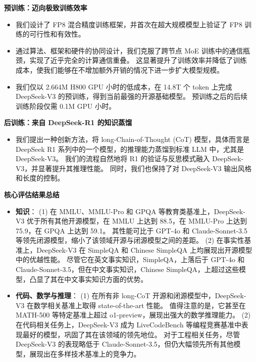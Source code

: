 \documentclass[11pt, a4paper, logo, copyright, nonumbering]{deepseek}
\newcommand{\dsviii}{DeepSeek-V3}
\begin{document}
\noindent
\textbf{预训练：迈向极致训练效率}
\begin{itemize}[topsep=0pt]
    \item
    我们设计了 FP8 混合精度训练框架，并首次在超大规模模型上验证了 FP8 训练的可行性和有效性。
    \item 
    通过算法、框架和硬件的协同设计，我们克服了跨节点 MoE 训练中的通信瓶颈，实现了近乎完全的计算通信重叠。
    这显著提升了训练效率并降低了训练成本，使我们能够在不增加额外开销的情况下进一步扩大模型规模。
    \item 
    我们仅以 2.664M H800 GPU 小时的低成本，在 14.8T 个 token 上完成 \dsviii{} 的预训练，得到当前最强的开源基础模型。
    预训练之后的后续训练阶段仅需 0.1M GPU 小时。
\end{itemize}

\noindent
\textbf{后训练：来自 DeepSeek-R1 的知识蒸馏}
\begin{itemize}[topsep=0pt]
    \item 
    我们提出一种创新方法，将 long-Chain-of-Thought (CoT) 模型，具体而言是 DeepSeek R1 系列中的一个模型，的推理能力蒸馏到标准 LLM 中，尤其是 \dsviii{}。
    我们的流程自然地将 R1 的验证与反思模式融入 \dsviii{}，并显著提升其推理性能。
    同时，我们也保持了对 \dsviii{} 输出风格和长度的控制。
\end{itemize}
\noindent
\textbf{核心评估结果总结}
\begin{itemize}[topsep=0pt]
    \item \textbf{知识}：
    (1) 
    在 MMLU、MMLU-Pro 和 GPQA 等教育类基准上，\dsviii{} 优于所有其他开源模型，在 MMLU 上达到 88.5，在 MMLU-Pro 上达到 75.9，在 GPQA 上达到 59.1。
    其性能可比于 GPT-4o 和 Claude-Sonnet-3.5 等领先闭源模型，缩小了该领域开源与闭源模型之间的差距。
    (2)
    在事实性基准上，\dsviii{} 在 SimpleQA 和 Chinese SimpleQA 上均展现出开源模型中的优越性能。
    尽管它在英文事实知识，SimpleQA，上落后于 GPT-4o 和 Claude-Sonnet-3.5，但在中文事实知识，Chinese SimpleQA，上超过这些模型，凸显了其在中文事实知识方面的优势。
    
    \item \textbf{代码、数学与推理}：
    (1)
    在所有非 long-CoT 开源和闭源模型中，\dsviii{} 在数学相关基准上取得 state-of-the-art 性能。
    值得注意的是，它甚至在 MATH-500 等特定基准上超过 o1-preview，展现出强大的数学推理能力。
    (2)
    在代码相关任务上，\dsviii{} 成为 LiveCodeBench 等编程竞赛基准中表现最好的模型，巩固了其在该领域的领先地位。
    对于工程相关任务，尽管 \dsviii{} 的表现略低于 Claude-Sonnet-3.5，但仍大幅领先所有其他模型，展现出在多样技术基准上的竞争力。
\end{itemize}
\end{document}

